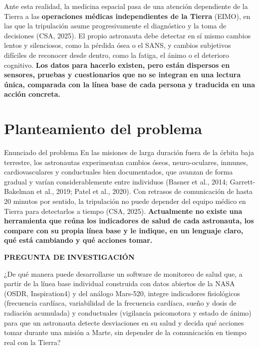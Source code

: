 \documentclass[11pt,a4paper]{article}
\begin{document}
Ante esta realidad, la medicina espacial pasa de una atención dependiente de la Tierra a las \textbf{operaciones médicas independientes de la Tierra} (EIMO), en las que la tripulación asume progresivamente el diagnóstico y la toma de decisiones (CSA, 2025). El propio astronauta debe detectar en sí mismo cambios lentos y silenciosos, como la pérdida ósea o el SANS, y cambios subjetivos difíciles de reconocer desde dentro, como la fatiga, el ánimo o el deterioro cognitivo. \textbf{Los datos para hacerlo existen, pero están dispersos en sensores, pruebas y cuestionarios que no se integran en una lectura única, comparada con la línea base de cada persona y traducida en una acción concreta.}

\section{Planteamiento del problema}

\begin{keybox}{Enunciado del problema}
En las misiones de larga duración fuera de la órbita baja terrestre, los astronautas experimentan cambios óseos, neuro-oculares, inmunes, cardiovasculares y conductuales bien documentados, que avanzan de forma gradual y varían considerablemente entre individuos (Basner et al., 2014; Garrett-Bakelman et al., 2019; Patel et al., 2020). Con retrasos de comunicación de hasta 20 minutos por sentido, la tripulación no puede depender del equipo médico en Tierra para detectarlos a tiempo (CSA, 2025). \textbf{Actualmente no existe una herramienta que reúna los indicadores de salud de cada astronauta, los compare con su propia línea base y le indique, en un lenguaje claro, qué está cambiando y qué acciones tomar.}
\end{keybox}

\vspace{0.4em}
\begin{questionbox}
{\sffamily\bfseries\small\color{mars!70!white} PREGUNTA DE INVESTIGACIÓN}\par\vspace{0.4em}
\begin{minipage}{0.86\linewidth}
\large ¿De qué manera puede desarrollarse un software de monitoreo de salud que, a partir de la línea base individual construida con datos abiertos de la NASA (OSDR, Inspiration4) y del análogo Mars-520, integre indicadores fisiológicos (frecuencia cardíaca, variabilidad de la frecuencia cardíaca, sueño y dosis de radiación acumulada) y conductuales (vigilancia psicomotora y estado de ánimo) para que un astronauta detecte desviaciones en su salud y decida qué acciones tomar durante una misión a Marte, sin depender de la comunicación en tiempo real con la Tierra?
\end{minipage}
\end{questionbox}
\end{document}
